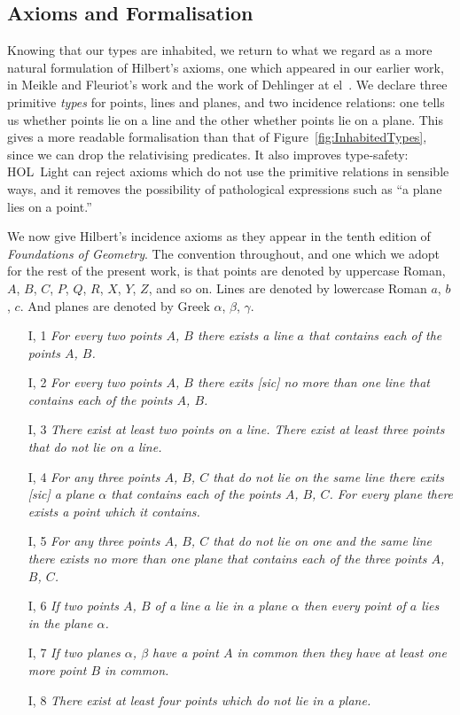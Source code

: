 \subsection{Axioms and Formalisation}
Knowing that our types are inhabited, we return to what we regard as a more natural formulation of Hilbert's axioms, one which appeared in our earlier work, in Meikle and Fleuriot's work and the work of Dehlinger at el~\cite{DehlingerFOG,MeikleFleuriotFormalizingHilbert,ScottMScThesis}. We declare three primitive \emph{types} for points, lines and planes, and two incidence relations: one tells us whether points lie on a line and the other whether points lie on a plane. This gives a more readable formalisation than that of Figure~\ref{fig:InhabitedTypes}, since we can drop the relativising predicates. It also improves type-safety: HOL~Light can reject axioms which do not use the primitive relations in sensible ways, and it removes the possibility of pathological expressions such as ``a plane lies on a point.''

We now give Hilbert's incidence axioms as they appear in the tenth edition of \emph{Foundations of Geometry}. The convention throughout, and one which we adopt for the rest of the present work, is that points are denoted by uppercase Roman, $A$, $B$, $C$, $P$, $Q$, $R$, $X$, $Y$, $Z$, and so on. Lines are denoted by lowercase Roman $a$, $b$, $c$. And planes are denoted by Greek $\alpha$, $\beta$, $\gamma$. 
\begin{enumerate}
\item[I, 1] \emph{For every two points $A$, $B$ there exists a line $a$ that contains each of the points $A$, $B$.}
\item[I, 2] \emph{For every two points $A$, $B$ there exits [sic] no more than one line that contains each of the points $A$, $B$.}
\item[I, 3] \emph{There exist at least two points on a line. There exist at least three points that do not lie on a line.}
\item[I, 4] \emph{For any three points $A$, $B$, $C$ that do not lie on the same line there exits [sic] a plane $\alpha$ that contains each of the points $A$, $B$, $C$. For every plane there exists a point which it contains.}
\item[I, 5] \emph{For any three points $A$, $B$, $C$ that do not lie on one and the same line there exists no more than one plane that contains each of the three points $A$, $B$, $C$.}
\item[I, 6] \emph{If two points $A$, $B$ of a line $a$ lie in a plane $\alpha$ then every point of $a$ lies in the plane $\alpha$.}
\item[I, 7] \emph{If two planes $\alpha$, $\beta$ have a point $A$ in common then they have at least one more point $B$ in common.}
\item[I, 8] \emph{There exist at least four points which do not lie in a plane.}
\end{enumerate}

